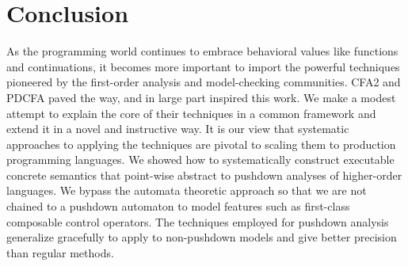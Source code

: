 \documentclass[preprint]{sigplanconf}
\begin{document}
\section{Conclusion}
As the programming world continues to embrace behavioral values like functions and continuations, it becomes more important to import the powerful techniques pioneered by the first-order analysis and model-checking communities.
%
CFA2 and PDCFA paved the way, and in large part inspired this work.
%
We make a modest attempt to explain the core of their techniques in a common framework and extend it in a novel and instructive way.
%
It is our view that systematic approaches to applying the techniques are pivotal to scaling them to production programming languages.
%
We showed how to systematically construct executable concrete semantics that point-wise abstract to pushdown analyses of higher-order languages.
%
We bypass the automata theoretic approach so that we are not chained to a pushdown automaton to model features such as first-class composable control operators.
%
The techniques employed for pushdown analysis generalize gracefully to apply to non-pushdown models and give better precision than regular methods.

\balance


\end{document}
